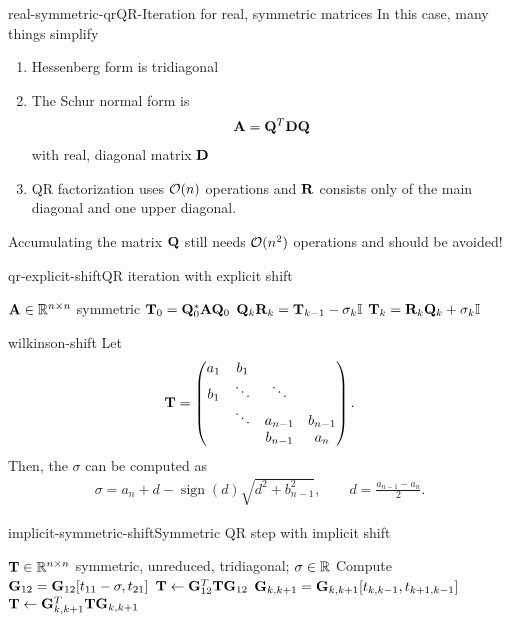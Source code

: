 \begin{Remark*}{real-symmetric-qr}{QR-Iteration for real, symmetric matrices}
  In this case, many things simplify
  \begin{enumerate}
  \item Hessenberg form is tridiagonal
  \item The Schur normal form is
    \begin{gather}
      \mathbf A = \mathbf Q^T\mathbf D\mathbf Q
    \end{gather}
    with real, diagonal matrix $\mathbf D$
  \item QR factorization uses $\mathcal O(n)$ operations and $\mathbf R$
    consists only of the main diagonal and one upper diagonal.
  \end{enumerate}
  Accumulating the matrix $\mathbf Q$ still needs $\mathcal O(n^2)$ operations and should be avoided!
\end{Remark*}

\begin{Algorithm*}{qr-explicit-shift}{QR iteration with explicit shift}
  \begin{algorithmic}[1]
    \Require $\mathbf A\in\mathbb R^{n\times n}$ symmetric
    \State $\mathbf T_0 = \mathbf Q_0^*\mathbf A\mathbf Q_0$
    \State $\mathbf Q_k\mathbf R_k = \mathbf T_{k-1} - \sigma_k\mathbb I$
    \State $\mathbf T_{k} = \mathbf R_k\mathbf Q_k + \sigma_k\mathbb I$
    \EndFor
  \end{algorithmic}
\end{Algorithm*}

\begin{Lemma}{wilkinson-shift}
  Let
  \begin{gather}
    \mathbf T =
    \begin{pmatrix}
      a_1&b_1\\
      b_1&\ddots&\ddots\\
      &\ddots&a_{n-1}&b_{n-1}\\
      &&b_{n-1}&a_n
    \end{pmatrix}.
  \end{gather}
  Then, the  $\sigma$ can be computed as
  \begin{gather}
    \sigma = a_n + d - \operatorname{sign}(d) \sqrt{d^2+b_{n-1}^2},
    \qquad d=\frac{a_{n-1}-a_n}2.
  \end{gather}
\end{Lemma}

\begin{Algorithm*}{implicit-symmetric-shift}{Symmetric QR step with implicit shift}
  \begin{algorithmic}[1]
    \Require $\mathbf T\in\mathbb R^{n\times n}$ symmetric, unreduced, tridiagonal; $\sigma\in\mathbb R$
    \State Compute $\mathbf G_{12} = \mathbf G_{12}[t_{11}-\sigma,t_{21}]$
    \State $\mathbf T \gets \mathbf G_{12}^T\mathbf T\mathbf G_{12}$
     
    \State $\mathbf G_{k,k+1} = \mathbf G_{k,k+1}[t_{k,k-1},t_{k+1,k-1}]$
    \State $\mathbf T \gets \mathbf G_{k,k+1}^T\mathbf T\mathbf G_{k,k+1}$
    \EndFor
  \end{algorithmic}
\end{Algorithm*}


